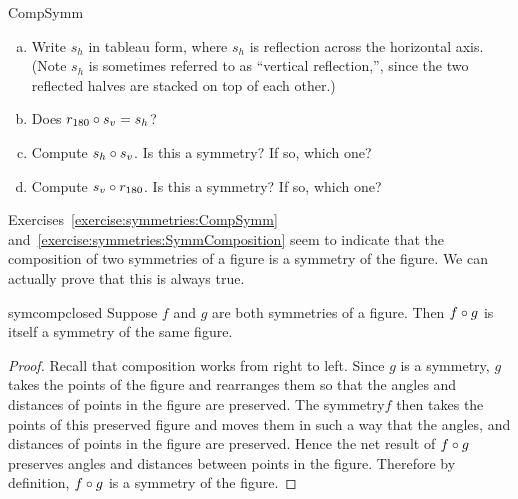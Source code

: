 \begin{exercise}{CompSymm}
\begin{enumerate}[(a)]
\item
Write $s_h$ in tableau form, where $s_h$ is reflection across the horizontal axis. (Note $s_h$ is sometimes referred to  as ``vertical reflection,'', since the two reflected halves are stacked on top of each other.)
\item
Does $r_{180} \circ s_v = s_h$?
\item
Compute $s_h \circ  s_v$. Is this a symmetry? If so, which one?
\item
Compute $s_v \circ r_{180}$.  Is this a symmetry? If so, which one?
\end{enumerate}
\end{exercise}

\noindent
Exercises~\ref{exercise:symmetries:CompSymm} and~\ref{exercise:symmetries:SymmComposition} seem to indicate that the composition of two symmetries of a figure is a symmetry of the figure. We can actually prove that this is always true.

\begin{prop}{symcompclosed}
Suppose $f$ and $g$ are both symmetries of a figure.  Then $f \circ g$ is itself a symmetry of the same figure.
\end{prop}

\begin{proof}
Recall that composition works from right to left. Since $g$ is a symmetry, $g$ takes the points of the figure and rearranges them so that the angles and distances of points in the figure are preserved.  The symmetry$f$ then takes the points of this preserved figure and moves them in such a way that the angles, and distances of points in the figure are preserved.  Hence the net result of $f \circ g$ preserves angles and distances between points in the figure.  Therefore by definition, $f \circ g$ is a symmetry of the figure.
\end{proof}

